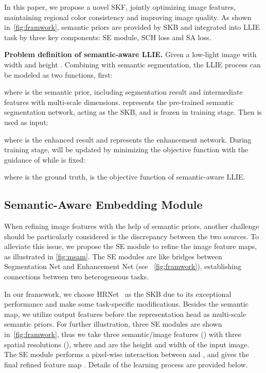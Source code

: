 \documentclass[10pt,twocolumn,letterpaper]{article}
\begin{document}
In this paper, we propose a novel SKF, jointly optimizing image features, maintaining regional color consistency and improving image quality. As shown in~\cref{fig:framwork}, semantic priors are provided by SKB and integrated into LLIE task by three key components: SE module, SCH loss and SA loss. 

\textbf{Problem definition of semantic-aware LLIE.} Given a low-light image  with width  and height . Combining with semantic segmentation, the LLIE process can be modeled as two functions, first: 
\vspace{-0.09cm}


where  is the semantic prior, including segmentation result and intermediate features with multi-scale dimensions.  represents the pre-trained semantic segmentation network, acting as the SKB, and  is frozen in training stage. Then  is used as input: 
\vspace{-0.09cm}


where  is the enhanced result and  represents the enhancement network. During training stage,  will be updated by minimizing the objective function with the guidance of  while  is fixed:
\vspace{-0.09cm}


where  is the ground truth,  is the objective function of semantic-aware LLIE.

\vspace{-0.1cm}
\subsection{Semantic-Aware Embedding Module}
\vspace{-0.05cm}
When refining image features with the help of semantic priors, another challenge should be particularly considered is the discrepancy between the two sources. To alleviate this issue, we propose the SE module to refine the image feature maps, as illustrated in \cref{fig:msam}. The SE modules are like bridges between Segmentation Net and Enhancement Net (see ~\cref{fig:framwork}), establishing connections between two heterogeneous tasks.

In our framework, we choose HRNet~\cite{wang2020hrnet} as the SKB due to its exceptional performance and make some task-specific modifications. Besides the semantic map, we utilize output features before the representation head as multi-scale semantic priors. For further illustration, three SE modules are shown in~\cref{fig:framwork}, thus we take three semantic/image features () with three spatial resolutions (), where  and  are the height and width of the input image. The SE module performs a pixel-wise interaction between  and , and gives the final refined feature map . Details of the learning process are provided below.
\end{document}
